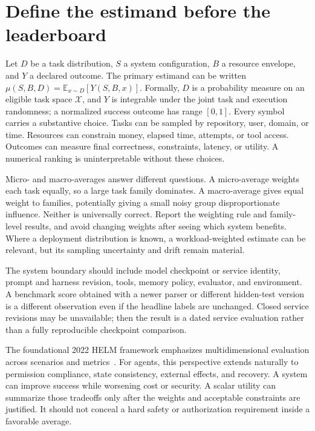 \section{Define the estimand before the leaderboard}\label{sec:C26:estimand}
Let $D$ be a task distribution, $S$ a system configuration, $B$ a resource envelope, and $Y$ a declared outcome. The primary estimand can be written $\mu(S,B,D)=\mathbb E_{x\sim D}[Y(S,B,x)]$. Formally, $D$ is a probability measure on an eligible task space $\mathcal X$, and $Y$ is integrable under the joint task and execution randomness; a normalized success outcome has range $[0,1]$. Every symbol carries a substantive choice. Tasks can be sampled by repository, user, domain, or time. Resources can constrain money, elapsed time, attempts, or tool access. Outcomes can measure final correctness, constraints, latency, or utility. A numerical ranking is uninterpretable without these choices.

Micro- and macro-averages answer different questions. A micro-average weights each task equally, so a large task family dominates. A macro-average gives equal weight to families, potentially giving a small noisy group disproportionate influence. Neither is universally correct. Report the weighting rule and family-level results, and avoid changing weights after seeing which system benefits. Where a deployment distribution is known, a workload-weighted estimate can be relevant, but its sampling uncertainty and drift remain material.

The system boundary should include model checkpoint or service identity, prompt and harness revision, tools, memory policy, evaluator, and environment. A benchmark score obtained with a newer parser or different hidden-test version is a different observation even if the headline labels are unchanged. Closed service revisions may be unavailable; then the result is a dated service evaluation rather than a fully reproducible checkpoint comparison.

The foundational 2022 HELM framework emphasizes multidimensional evaluation across scenarios and metrics~\cite{liang2022helm}. For agents, this perspective extends naturally to permission compliance, state consistency, external effects, and recovery. A system can improve success while worsening cost or security. A scalar utility can summarize those tradeoffs only after the weights and acceptable constraints are justified. It should not conceal a hard safety or authorization requirement inside a favorable average.

